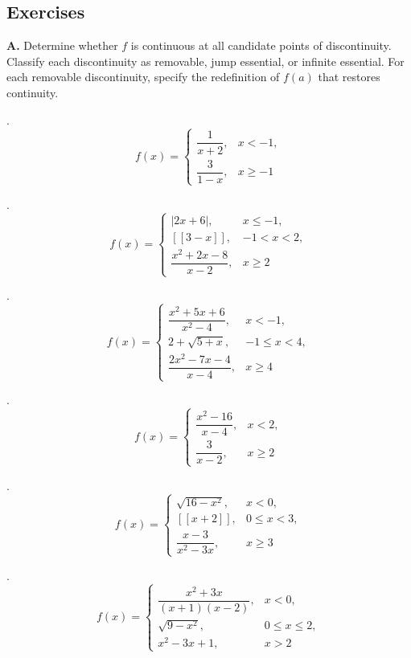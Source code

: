  \pagebreak

\subsection*{Exercises}
\label{subsec:1.5.6}

\raggedcolumns
\setlength{\columnsep}{1.5em}


\medskip
\noindent\textbf{A.} Determine whether \(f\) is continuous at all candidate points of discontinuity. Classify each discontinuity as removable, jump essential, or infinite essential. For each removable discontinuity, specify the redefinition of \(f(a)\) that restores continuity.

.
\[
f(x) = \begin{cases}
\dfrac{1}{x + 2}, & x < -1, \\[10pt]
\dfrac{3}{1 - x}, & x \ge -1
\end{cases}
\]

.
\[
f(x) = \begin{cases}
|2x + 6|, & x \le -1, \\[8pt]
[\![3 - x]\!], & -1 < x < 2, \\[8pt]
\dfrac{x^{2} + 2x - 8}{x - 2}, & x \ge 2
\end{cases}
\]

.
\[
f(x) = \begin{cases}
\dfrac{x^{2} + 5x + 6}{x^{2} - 4}, & x < -1, \\[10pt]
2 + \sqrt{5 + x}, & -1 \le x < 4, \\[10pt]
\dfrac{2x^{2} - 7x - 4}{x - 4}, & x \ge 4
\end{cases}
\]

.
\[
f(x) = \begin{cases}
\dfrac{x^{2} - 16}{x - 4}, & x < 2, \\[10pt]
\dfrac{3}{x - 2}, & x \ge 2
\end{cases}
\]

.
\[
f(x) = \begin{cases}
\sqrt{16 - x^{2}}, & x < 0, \\[6pt]
[\![x + 2]\!], & 0 \le x < 3, \\[8pt]
\dfrac{x - 3}{x^{2} - 3x}, & x \ge 3
\end{cases}
\]

.
\[
f(x) = \begin{cases}
\dfrac{x^{2} + 3x}{(x + 1)(x - 2)}, & x < 0, \\[10pt]
\sqrt{9 - x^{2}}, & 0 \le x \le 2, \\[8pt]
x^{2} - 3x + 1, & x > 2
\end{cases}
\]


